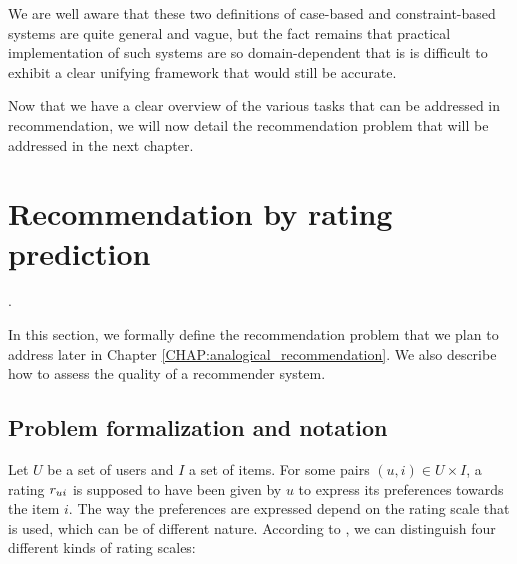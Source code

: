 We are well aware that these two definitions of case-based and constraint-based
systems are quite general and vague, but the fact remains that practical
implementation of such systems are so domain-dependent that is is difficult to
exhibit a clear unifying framework that would still be accurate.

Now that we have a clear overview of the various tasks that can be addressed in
recommendation, we will now detail the recommendation problem that will be
addressed in the next chapter.

\section{Recommendation by rating prediction}.
\label{SEC:recommendation_rating_prediction}

In this section, we formally define the recommendation problem that we plan to
address later in Chapter \ref{CHAP:analogical_recommendation}. We also describe
how to assess the quality of a recommender system.

\subsection{Problem formalization and notation}
Let $U$ be a set of users and $I$ a set of items. For some pairs $(u,i) \in U
\times I$, a rating  $r_{ui}$ is supposed to have been given by $u$ to express
its preferences towards the item $i$. The way the preferences are expressed
depend on the rating scale that is used, which can be of different nature.
According to \cite{SchFraHerSen07}, we can distinguish four different kinds of
rating scales:

